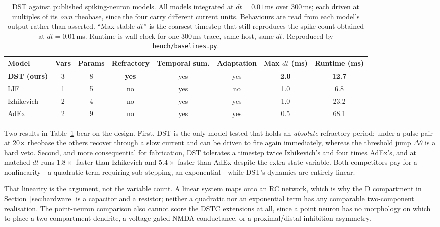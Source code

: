 \documentclass[12pt]{article}
\begin{document}
\begin{table}[htbp]
\centering
\small
\caption{DST against published spiking-neuron models. All models integrated at
$dt = 0.01$\,ms over 300\,ms; each driven at multiples of its \textit{own}
rheobase, since the four carry different current units. Behaviours are read
from each model's output rather than asserted. ``Max stable $dt$'' is the
coarsest timestep that still reproduces the spike count obtained at
$dt = 0.01$\,ms. Runtime is wall-clock for one 300\,ms trace, same host, same
$dt$. Reproduced by \texttt{bench/baselines.py}.}
\label{tab:baselines}
\begin{tabular}{lccccccc}
\toprule
\textbf{Model} & \textbf{Vars} & \textbf{Params} & \textbf{Refractory}
  & \textbf{Temporal sum.} & \textbf{Adaptation}
  & \textbf{Max $dt$ (ms)} & \textbf{Runtime (ms)} \\
\midrule
\textbf{DST (ours)} & 3 & 8 & \textbf{yes} & yes & yes & \textbf{2.0} & \textbf{12.7} \\
LIF                 & 1 & 5 & no  & yes & no  & 1.0 & 6.8 \\
Izhikevich          & 2 & 4 & no  & yes & yes & 1.0 & 23.2 \\
AdEx                & 2 & 9 & no  & yes & yes & 0.5 & 68.1 \\
\bottomrule
\end{tabular}
\end{table}

Two results in Table~\ref{tab:baselines} bear on the design. First, DST is the
only model tested that holds an \textit{absolute} refractory period: under a
pulse pair at 20$\times$ rheobase the others recover through a slow current and
can be driven to fire again immediately, whereas the threshold jump $\Delta\theta$
is a hard veto. Second, and more consequential for fabrication, DST tolerates a
timestep twice Izhikevich's and four times AdEx's, and at matched $dt$ runs
$1.8\times$ faster than Izhikevich and $5.4\times$ faster than AdEx despite the
extra state variable. Both competitors pay for a nonlinearity---a quadratic term
requiring sub-stepping, an exponential---while DST's dynamics are entirely
linear.

That linearity is the argument, not the variable count. A linear system maps
onto an RC network, which is why the D compartment in Section~\ref{sec:hardware}
is a capacitor and a resistor; neither a quadratic nor an exponential term has
any comparable two-component realisation. The point-neuron comparison also
cannot score the DSTC extensions at all, since a point neuron has no morphology
on which to place a two-compartment dendrite, a voltage-gated NMDA conductance,
or a proximal/distal inhibition asymmetry.
\end{document}
